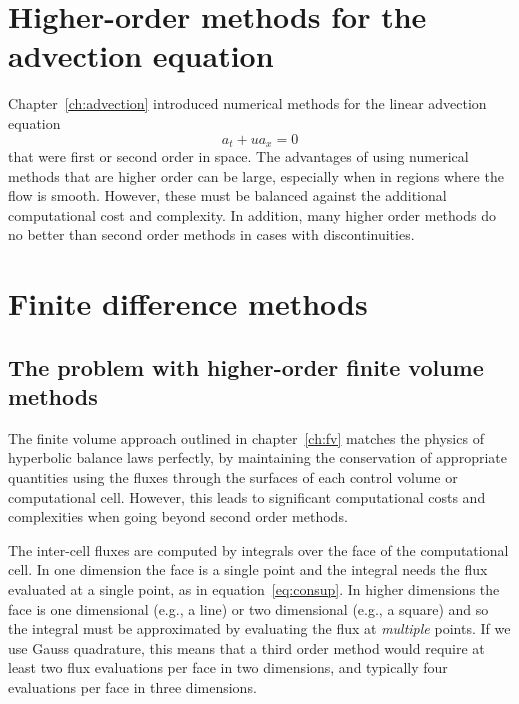 
\section{Higher-order methods for the advection equation}
\label{sec:ho-intro}

Chapter~\ref{ch:advection} introduced numerical methods for the linear
advection equation
\begin{equation}
\label{eq:ho-advect}
a_t + u a_x = 0
\end{equation}
that were first or second order in space. The advantages of using numerical
methods that are higher order can be large, especially when in regions where
the flow is smooth. However, these must be balanced against the additional
computational cost and complexity. In addition, many higher order methods do no
better than second order methods in cases with discontinuities.

\section{Finite difference methods}
\label{sec:ho-fd}

\subsection{The problem with higher-order finite volume methods}

The finite volume approach outlined in chapter~\ref{ch:fv}
matches the physics of hyperbolic balance
laws perfectly, by maintaining the conservation of appropriate quantities using
the fluxes through the surfaces of each control volume or computational cell.
However, this leads to significant computational costs and complexities when
going beyond second order methods.

The inter-cell fluxes are computed by integrals over the face of the
computational cell. In one dimension the face is a single point and the
integral needs the flux evaluated at a single point, as in
equation~\ref{eq:consup}. In higher dimensions the face is one dimensional
(e.g., a line) or two dimensional (e.g., a square) and so the integral must be
approximated by evaluating the flux at \emph{multiple} points. If we use Gauss
quadrature, this means that a third order method would require at least two
flux evaluations per face in two dimensions, and typically four evaluations per
face in three dimensions.

